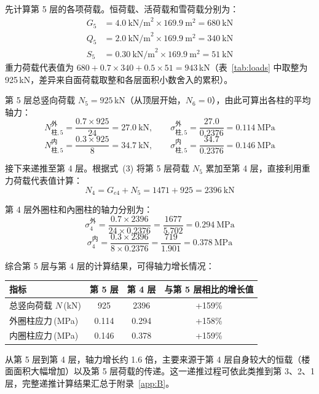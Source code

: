 \documentclass[12pt,a4paper,UTF8]{ctexart}
\begin{document}
先计算第 5 层的各项荷载。恒荷载、活荷载和雪荷载分别为：
\begin{align*}
    G_5 & = 4.0\ \text{kN/m}^2 \times 169.9\ \text{m}^2 = 680\ \text{kN} \\
    Q_5 & = 2.0\ \text{kN/m}^2 \times 169.9\ \text{m}^2 = 340\ \text{kN} \\
    S_5 & = 0.30\ \text{kN/m}^2 \times 169.9\ \text{m}^2 = 51\ \text{kN}
\end{align*}
重力荷载代表值为 $680 + 0.7 \times 340 + 0.5 \times 51 = 943$\,kN（表~\ref{tab:loads} 中取整为 925\,kN，差异来自面荷载取整和各层面积小数舍入的累积）。

第 5 层总竖向荷载 $N_5 = 925$\,kN（从顶层开始，$N_6 = 0$），由此可算出各柱的平均轴力：
\[
    N_{\text{柱},5}^{\text{外}} = \frac{0.7 \times 925}{24} = 27.0\ \text{kN},\qquad
    \sigma_{\text{柱},5}^{\text{外}} = \frac{27.0}{0.2376} = 0.114\ \text{MPa}
\]
\[
    N_{\text{柱},5}^{\text{内}} = \frac{0.3 \times 925}{8} = 34.7\ \text{kN},\qquad
    \sigma_{\text{柱},5}^{\text{内}} = \frac{34.7}{0.2376} = 0.146\ \text{MPa}
\]

接下来递推至第 4 层。根据式~(3) 将第 5 层荷载 $N_5$ 累加至第 4 层，直接利用重力荷载代表值计算：
\[
    N_4 = G_{e4} + N_5 = 1471 + 925 = 2396\ \text{kN}
\]

第 4 层外圈柱和內圈柱的轴力分别为：
\[
    \sigma_4^{\text{外}} = \frac{0.7 \times 2396}{24 \times 0.2376} = \frac{1677}{5.702} = 0.294\ \text{MPa}
\]
\[
    \sigma_4^{\text{内}} = \frac{0.3 \times 2396}{8 \times 0.2376} = \frac{719}{1.901} = 0.378\ \text{MPa}
\]

综合第 5 层与第 4 层的计算结果，可得轴力增长情况：

\begin{center}
    \begin{tabular}{lccc}
        \toprule
        指标              & 第 5 层 & 第 4 层 & 与第 5 层相比的增长值 \\
        \midrule
        总竖向荷载 $N$\,(kN) & 925   & 2396  & +159\%       \\
        外圈柱应力\,(MPa)    & 0.114 & 0.294 & +158\%       \\
        内圈柱应力\,(MPa)    & 0.146 & 0.378 & +159\%       \\
        \bottomrule
    \end{tabular}
\end{center}

从第 5 层到第 4 层，轴力增长约 1.6 倍，主要来源于第 4 层自身较大的恒载（楼面面积大幅增加）以及第 5 层荷载的传递。这一递推过程可依此类推到第 3、2、1 层，完整递推计算结果汇总于附录~\ref{app:B}。
\end{document}
